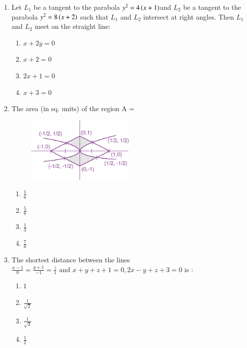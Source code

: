 \documentclass[journal]{IEEEtran}
\theoremstyle{remark}
\begin{document}
\begin{enumerate}
\item  Let $L_1$ be a tangent to the parabola $y^2 = 4 \left(x+1\right)$and $L_2$ be a tangent to the parabola $y^2 = 8\left(x+2\right)$ such that $L_1$ and $L_2$ intersect at right angles. Then $L_1$ and $L_2$ meet on the straight line:\hfill{}


\begin{multicols}{4}
\begin{enumerate}
\item $x+2y = 0$
\item $ x+2 = 0$
\item $ 2x+1 = 0$
\item $x+3 = 0$
\end{enumerate}
\end{multicols}

\item  The area (in sq. units) of the region A = 

\hfill{}


\begin{figure}[h] 
    \centering
    \includegraphics[width=0.5\textwidth]{figure/5.png}
\end{figure}

\begin{multicols}{4}
\begin{enumerate}
\item $\frac{1}{6}$
\item $\frac{5}{6}$
\item $\frac{1}{3}$
\item $\frac{7}{6}$
\end{enumerate}
\end{multicols}

\item  The shortest distance between the lines $\frac{x - 1}{0} = \frac{y + 1}{-1} = \frac{z}{1} \text{ and } x+y+z+1 = 0, 2x-y+z+3 = 0$ is :\hfill{}

\begin{multicols}{4}
\begin{enumerate}
\item $1$
\item $\frac{1}{\sqrt{2}}$
\item $\frac{1}{\sqrt{3}}$
\item $\frac{1}{2}$
\end{enumerate}
\end{multicols}


\end{enumerate}
\end{document}
